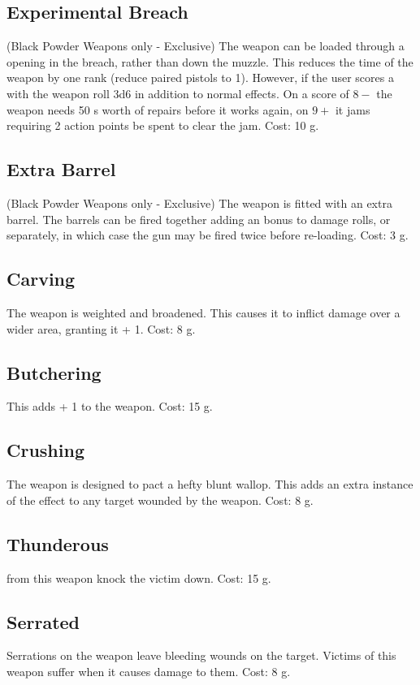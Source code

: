 \subsection{Experimental Breach}
(Black Powder Weapons only - Exclusive) The weapon can be loaded through a opening in the breach, rather than down the muzzle. This reduces the  time of the weapon by one rank (reduce paired pistols to  1). However, if the user scores a  with the weapon roll 3d6 in addition to normal  effects. On a score of $8-$ the weapon needs 50 s worth of repairs before it works again, on $9+$ it jams requiring 2 action points be spent to clear the jam. Cost: 10 g.

\subsection{Extra Barrel}
(Black Powder Weapons only - Exclusive) The weapon is fitted with an extra barrel. The barrels can be fired together adding an  bonus to damage rolls, or separately, in which case the gun may be fired twice before re-loading. Cost: 3 g.

\subsection{Carving}
The weapon is weighted and broadened. This causes it to inflict damage over a wider area, granting it  + 1. Cost: 8 g. 

\subsection{Butchering}
This adds  + 1 to the weapon. Cost: 15 g.

\subsection{Crushing}
The weapon is designed to pact a hefty blunt wallop. This adds an extra instance of the  effect to any target wounded by the weapon. Cost: 8 g.

\subsection{Thunderous}
 from this weapon knock the victim down. Cost: 15 g.

\subsection{Serrated}
Serrations on the weapon leave bleeding wounds on the target. Victims of this weapon suffer  when it causes damage to them. Cost: 8 g.

